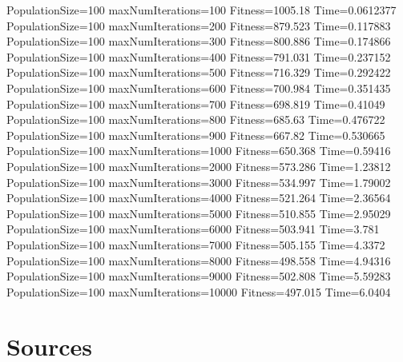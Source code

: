 \documentclass[10pt,letterpaper]{article}
\begin{document}
PopulationSize=100 maxNumIterations=100 Fitness=1005.18 Time=0.0612377
PopulationSize=100 maxNumIterations=200 Fitness=879.523 Time=0.117883
PopulationSize=100 maxNumIterations=300 Fitness=800.886 Time=0.174866
PopulationSize=100 maxNumIterations=400 Fitness=791.031 Time=0.237152
PopulationSize=100 maxNumIterations=500 Fitness=716.329 Time=0.292422
PopulationSize=100 maxNumIterations=600 Fitness=700.984 Time=0.351435
PopulationSize=100 maxNumIterations=700 Fitness=698.819 Time=0.41049
PopulationSize=100 maxNumIterations=800 Fitness=685.63 Time=0.476722
PopulationSize=100 maxNumIterations=900 Fitness=667.82 Time=0.530665
PopulationSize=100 maxNumIterations=1000 Fitness=650.368 Time=0.59416
PopulationSize=100 maxNumIterations=2000 Fitness=573.286 Time=1.23812
PopulationSize=100 maxNumIterations=3000 Fitness=534.997 Time=1.79002
PopulationSize=100 maxNumIterations=4000 Fitness=521.264 Time=2.36564
PopulationSize=100 maxNumIterations=5000 Fitness=510.855 Time=2.95029
PopulationSize=100 maxNumIterations=6000 Fitness=503.941 Time=3.781
PopulationSize=100 maxNumIterations=7000 Fitness=505.155 Time=4.3372
PopulationSize=100 maxNumIterations=8000 Fitness=498.558 Time=4.94316
PopulationSize=100 maxNumIterations=9000 Fitness=502.808 Time=5.59283
PopulationSize=100 maxNumIterations=10000 Fitness=497.015 Time=6.0404


\section{Sources}
\end{document}
